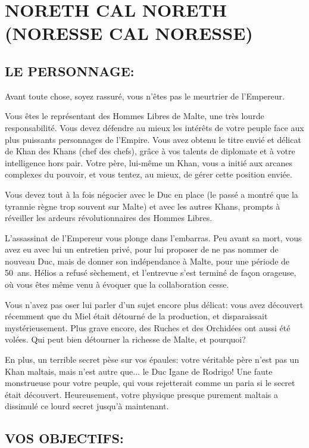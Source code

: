 \documentclass[14pt,twocolumn]{extarticle}
\begin{document}
\section{NORETH CAL NORETH\\(NORESSE CAL NORESSE)}

\subsection{LE PERSONNAGE:}

Avant toute chose, soyez rassuré, vous n'êtes pas le meurtrier de l'Empereur.

Vous êtes le représentant des Hommes Libres de Malte, une très lourde
responsabilité. Vous devez défendre au mieux les intérêts de votre peuple face
aux plus puissants personnages de l'Empire. Vous avez obtenu le titre envié et
délicat de Khan des Khans (chef des chefs), grâce à vos talents de diplomate et
à votre intelligence hors pair. Votre père, lui-même un Khan, vous a initié
aux arcanes complexes du pouvoir, et vous tentez, au mieux, de gérer cette
position enviée.

Vous devez tout à la fois négocier avec le Duc en place (le passé a montré que
la tyrannie règne trop souvent sur Malte) et avec les autres Khans, prompts à
réveiller les ardeurs \og révolutionnaires\fg{} des Hommes Libres.

L'assassinat de l'Empereur vous plonge dans l'embarras. Peu avant sa mort, vous
avez eu avec lui un entretien privé, pour lui proposer de ne pas nommer de
nouveau Duc, mais de donner son indépendance à Malte, pour une période de
50~ans. Hélios a refusé sèchement, et l'entrevue s'est terminé de façon
orageuse, où vous êtes même venu à évoquer que la collaboration cesse.

Vous n'avez pas oser lui parler d'un sujet encore plus délicat: vous avez
découvert récemment que du Miel était détourné de la production, et
disparaissait mystérieusement. Plus grave encore, des Ruches et des Orchidées
ont aussi été volées. Qui peut bien détourner la richesse de Malte, et
pourquoi?

En plus, un terrible secret pèse sur vos épaules: votre véritable père n'est
pas un Khan maltais, mais n'est autre que... le Duc Igane de Rodrigo! Une
\og faute\fg{} monstrueuse pour votre peuple, qui vous rejetterait comme un
paria si le secret était découvert. Heureusement, votre physique presque
purement maltais a dissimulé ce lourd secret jusqu'à maintenant.

\subsection{VOS OBJECTIFS:}
\end{document}

